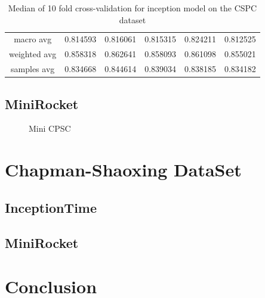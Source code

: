 \documentclass{article}
\begin{document}
\begin{table}[tpb]
\begin{tabular}{|cccccc|}
macro avg                    &                      0.814593 &                     0.816061 &                       0.815315 &                          0.824211 &                             0.812525 \\
weighted avg                 &                      0.858318 &                     0.862641 &                       0.858093 &                          0.861098 &                             0.855021 \\
samples avg                  &                      0.834668 &                     0.844614 &                       0.839034 &                          0.838185 &                             0.834182 \\

\hline
\end{tabular}
\caption{Median of 10 fold cross-validation for inception model on the CSPC dataset}
\label{tab:inception_cspc}
\end{table}
\subsection{MiniRocket}
\begin{figure}[!htbp]

  \caption{Mini CPSC}\label{fig:mini_cpsc}
\end{figure}
\section{Chapman-Shaoxing DataSet}
\subsection{InceptionTime}
\subsection{MiniRocket}

\section{Conclusion}
\printbibliography
\end{document}
